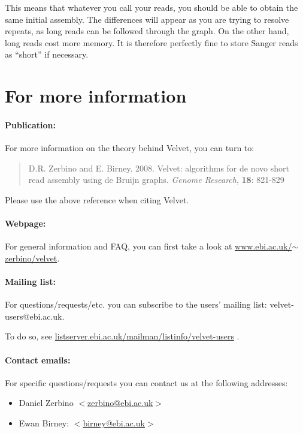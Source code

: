 \documentclass{article}
\begin{document}
This means that whatever you call your reads, you should be able to obtain the same initial assembly. The differences will appear as you are trying to resolve repeats, as long reads can be followed through the graph. On the other hand, long reads cost more memory. It is therefore perfectly fine to store Sanger reads as ``short'' if necessary.

\section{For more information}

\paragraph{Publication:}
 
 \label{sec:paper}
 
For more information on the theory behind Velvet, you can turn to:
\begin{quote}
D.R. Zerbino and E. Birney. 2008. Velvet: algorithms for de novo short read assembly using de Bruijn graphs. \emph{Genome Research}, \textbf{18}: 821-829
\end{quote}
Please use the above reference when citing Velvet.

\paragraph{Webpage:}

For general information and FAQ, you can first take a look at 
\href{http://www.ebi.ac.uk/~zerbino/velvet/}{www.ebi.ac.uk/$\sim$zerbino/velvet}.

\paragraph{Mailing list:}

For questions/requests/etc. you can subscribe to the users' mailing list: velvet-users@ebi.ac.uk.

To do so, see \href{http://listserver.ebi.ac.uk/mailman/listinfo/velvet-users}{listserver.ebi.ac.uk/mailman/listinfo/velvet-users} .


\paragraph{Contact emails:}

For specific questions/requests you can contact us at the following addresses:
\begin{itemize}
\item Daniel Zerbino $<$\href{mailto:zerbino@ebi.ac.uk}{zerbino@ebi.ac.uk}$>$
\item Ewan Birney: $<$\href{mailto:birney@ebi.ac.uk}{birney@ebi.ac.uk}$>$
\end{itemize}
\end{document}
